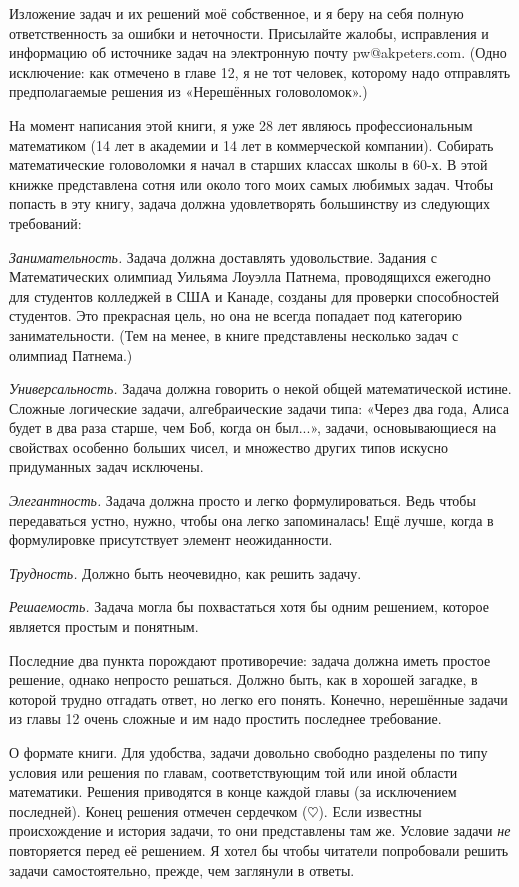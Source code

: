 Изложение задач и их решений моё собственное, и я беру на себя полную ответственность за ошибки и неточности.
Присылайте жалобы, исправления и информацию об источнике задач на электронную почту pw@akpeters.com.
(Одно исключение: как отмечено в главе 12, я не тот человек, которому надо отправлять предполагаемые решения из «Нерешённых головоломок».)

На момент написания этой книги, я уже 28 лет являюсь профессиональным математиком
(14 лет в академии и 14 лет в коммерческой компании).
Собирать математические головоломки я начал в старших классах школы в 60-х.
В этой книжке представлена сотня или около того моих самых любимых задач.
Чтобы попасть в эту книгу, задача должна удовлетворять большинству из следующих требований:

\textit{Занимательность.}
Задача должна доставлять удовольствие.
Задания с Математических олимпиад Уильяма Лоуэлла Патнема, проводящихся ежегодно для студентов колледжей в США и Канаде, созданы для проверки способностей студентов.
Это прекрасная цель, но она не всегда попадает под категорию занимательности.
(Тем на менее, в книге представлены несколько задач с олимпиад Патнема.)

\textit{Универсальность.}
Задача должна говорить о некой общей математической истине.
Сложные логические задачи, алгебраические задачи типа:
«Через два года, Алиса будет в два раза старше, чем Боб, когда он был...», задачи, основывающиеся на свойствах особенно больших  чисел, и множество других типов искусно придуманных задач исключены.

\textit{Элегантность.}
Задача должна  просто и легко формулироваться.
Ведь чтобы передаваться устно, нужно, чтобы она легко запоминалась! Ещё лучше, когда в формулировке присутствует элемент неожиданности.

\textit{Трудность.}
Должно быть неочевидно, как решить задачу.

\textit{Решаемость.}
Задача могла бы похвастаться хотя бы одним решением, которое является простым и понятным.

Последние два пункта порождают противоречие: задача должна иметь простое решение, однако непросто решаться.
Должно быть, как в хорошей загадке, в которой трудно отгадать ответ, но легко его понять.
Конечно, нерешённые задачи из главы 12 очень сложные и им  надо простить последнее требование.

О формате книги.
Для удобства, задачи довольно свободно разделены по типу условия или решения по главам, соответствующим той или иной области математики.
Решения приводятся в конце каждой главы (за исключением последней).
Конец решения отмечен сердечком ($\heartsuit$).
Если известны происхождение и история задачи, то они представлены там же.
Условие задачи \emph{не} повторяется перед её решением.
Я хотел бы чтобы читатели попробовали решить задачи самостоятельно, прежде, чем заглянули в ответы.

